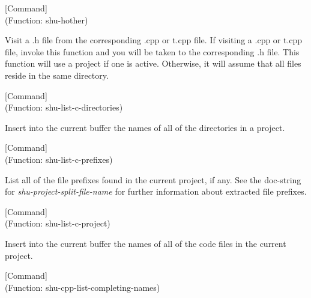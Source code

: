 \vspace{1em}
\noindent
{}
\usebox{\funcname}
 \hfill [Command]\\%
 (Function: shu-hother)

\begin{doc-string}
Visit a .h file from the corresponding .cpp or t.cpp file.  If visiting a
.cpp or t.cpp file, invoke this function and you will be taken to the
corresponding .h file.  This function will use a project if one is active.
Otherwise, it will assume that all files reside in the same directory.
\end{doc-string}

\vspace{1em}
\noindent
{}
\usebox{\funcname}
 \hfill [Command]\\%
 (Function: shu-list-c-directories)

\begin{doc-string}
Insert into the current buffer the names of all of the directories in a project.
\end{doc-string}

\vspace{1em}
\noindent
{}
\usebox{\funcname}
 \hfill [Command]\\%
 (Function: shu-list-c-prefixes)

\begin{doc-string}
List all of the file prefixes found in the current project, if any.
See the doc-string for \emph{shu-project-split-file-name} for further information
about extracted file prefixes.
\end{doc-string}

\vspace{1em}
\noindent
{}
\usebox{\funcname}
 \hfill [Command]\\%
 (Function: shu-list-c-project)

\begin{doc-string}
Insert into the current buffer the names of all of the code files in the
current project.
\end{doc-string}

\vspace{1em}
\noindent
{}
\usebox{\funcname}
 \hfill [Command]\\%
 (Function: shu-cpp-list-completing-names)

